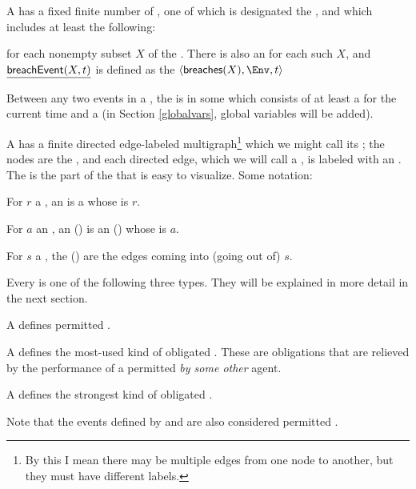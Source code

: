 \documentclass[12pt]{article}
\begin{document}
A \Contract has a fixed finite number of , one of which is designated the , and which includes at least the following:
\begin{LPPI}
\item {}
\item {} for each nonempty subset $X$ of the \Roles. There is also an \Action {} for each such $X$, and $\underline{\textsf{breachEvent}(X,t)}$ is defined as the \Event $\tup{\breaches{X}, \Env, t}$
\end{LPPI}
Between any two events in a \trace, the \Contract is in some  which consists of at least a \TimeStamp for the current time and a \State (in Section \ref{globalvars}, global variables will be added).

\medskip

A \Contract has a finite directed edge-labeled multigraph\footnote{By this I mean there may be multiple edges from one node to another, but they must have different labels.} which we might call its ; the nodes are the \States, and each directed edge, which we will call a , is labeled with an \Action. The \skeleton is the part of the \Contract that is easy to visualize. Some notation:
\begin{LPPI}
\item For $r$ a \Role, an  is a \transition whose \Role is $r$.
\item For $a$ an \Action, an  () is an \Event (\transition) whose \Action is $a$.
\item For $s$ a \State, the  () are the edges coming into (going out of) $s$.
\end{LPPI}
Every \transition is one of the following three types. They will be explained in more detail in the next section.
\begin{LPPI}
\item A  defines permitted \Events.
\item A  defines the most-used kind of obligated \Events. These are obligations that are relieved by the performance of a permitted {\Event} {\it by some other} agent.
\item A  defines the strongest kind of obligated \Events.
\end{LPPI}
Note that the events defined by \rmustntrans and \mustntrans are also considered permitted \Events.
\end{document}
